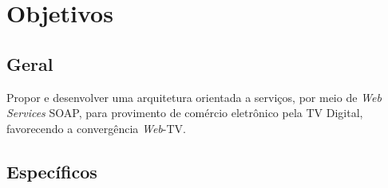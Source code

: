 \section{Objetivos} \label{sec:objetivos}

\subsection{Geral}

Propor e desenvolver uma arquitetura orientada a serviços,
por meio de \textit{Web Services} SOAP, para provimento de comércio eletrônico
pela TV Digital, favorecendo a convergência \textit{Web}-TV. 

\subsection{Específicos}

